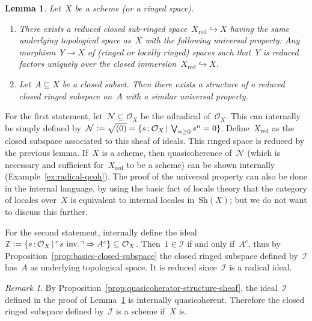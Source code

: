 \documentclass[10pt,reqno,a4paper]{amsbook}
\makeatletter
\theoremstyle{definition}
\theoremstyle{plain}
\newtheorem{lemma}[defn]{Lemma}
\theoremstyle{remark}
\newtheorem{rem}[defn]{Remark}
\renewcommand{\O}{\mathcal{O}}
\newcommand{\N}{\mathcal{N}}
\newcommand{\I}{\mathcal{I}}
\newcommand{\Sh}{\mathrm{Sh}}
\newcommand{\?}{\,{:}\,}
\renewcommand{\_}{\mathpunct{.}\,}
\newcommand{\speak}[1]{\ulcorner\text{\textnormal{#1}}\urcorner}
\newcommand{\inv}{inv.\@}
\newcommand{\defeq}{\vcentcolon=}
\renewenvironment{proof}[1][\proofname]{\par
  \pushQED{\qed}%
  \normalfont \topsep6\p@\@plus6\p@\relax
  \trivlist
  \item[\hskip\labelsep
        \itshape
    #1\@addpunct{.}]\ignorespaces
}{%
  \popQED\endtrivlist\@endpefalse
}
\makeatother
\begin{document}
\begin{lemma}\label{lemma:reduced-subspace}
Let~$X$ be a scheme (or a ringed space).
\begin{enumerate}
\item There exists a reduced closed sub-ringed space~$X_\mathrm{red}
\hookrightarrow X$ having the same underlying topological space as~$X$ with
the following universal property: Any morphism~$Y \to X$
of (ringed or locally ringed) spaces such that~$Y$ is reduced factors uniquely
over the closed immersion~$X_\mathrm{red} \hookrightarrow X$.
\item Let~$A \subseteq X$ be a closed subset. Then there exists a structure of
a reduced closed ringed subspace on~$A$ with a similar universal
property.
\end{enumerate}
\end{lemma}
\begin{proof}For the first statement, let~$\N \subseteq \O_X$ be the nilradical
of~$\O_X$. This can internally be simply defined by~$\N \defeq \sqrt{(0)} = \{
s\?\O_X \,|\, \bigvee_{n \geq 0} s^n = 0 \}$. Define~$X_\mathrm{red}$ as the closed
subspace associated to this sheaf of ideals. This ringed space is reduced by the
previous lemma. If~$X$ is a scheme, then quasicoherence of~$\N$ (which is
necessary and sufficient for~$X_\mathrm{red}$ to be a scheme) can be shown
internally (Example~\ref{ex:radical-qcoh}).
The proof of the universal property can also be done in the
internal language, by using the basic fact of locale theory that the
category of locales over~$X$ is equivalent to internal locales in~$\Sh(X)$; but
we do not want to discuss this further.

For the second statement, internally define the ideal~$\I \defeq \{ s\?\O_X
\,|\, \speak{$s$ \inv} \Rightarrow A^c \} \subseteq \O_X$.
Then~$1 \in \I$ if and only if~$A^c$, thus by
Proposition~\ref{prop:basics-closed-subspace} the closed ringed subspace defined
by~$\I$ has~$A$ as underlying topological space. It is reduced since~$\I$ is a
radical ideal.\end{proof}

\begin{rem}By Proposition~\ref{prop:quasicoherator-structure-sheaf}, the
ideal~$\I$ defined in the proof of Lemma~\ref{lemma:reduced-subspace} is
internally quasicoherent. Therefore the closed ringed subspace defined by~$\I$
is a scheme if~$X$ is.\end{rem}
\end{document}
